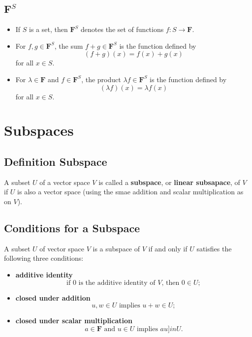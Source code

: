 \documentclass{article}
\begin{document}
	\subsection{$\mathbf{F}^S$}
	\begin{itemize}
		\item If $S$ is a set, then $\mathbf{F}^S$ denotes the set of functions $f:S\to\mathbf{F}$.
		\item For $f,g\in\mathbf{F}^S$, the sum $f + g\in\mathbf{F}^S$ is the function defined by
		\begin{equation*}
			(f + g)(x) = f(x) + g(x)
		\end{equation*}
		for all $x\in S$.
		\item For $\lambda\in\mathbf{F}$ and $f\in\mathbf{F}^S$, the product $\lambda f\in\mathbf{F}^S$ is the function defined by
		\begin{equation*}
			(\lambda f)(x) = \lambda f(x)
		\end{equation*}
		for all $x\in S$.
	\end{itemize}

	\section{Subspaces}
	\subsection{Definition Subspace}
	A subset $U$ of a vector space $V$ is called a \textbf{subspace}, or \textbf{linear subsapace}, of $V$ if $U$ is also a vector space (using the smae addition and scalar multiplication as on $V$).

	\subsection{Conditions for a Subspace}
	A subset $U$ of vector space $V$ is a subspace of $V$ if and only if $U$ satisfies the following three conditions:
	\begin{itemize}
		\item\textbf{additive identity}
		\begin{equation*}
			\text{if } 0 \text{ is the additive identity of } V \text{, then } 0\in U;
		\end{equation*}
		\item\textbf{closed under addition}
		\begin{equation*}
			u,w\in U \text{ implies } u+ w \in U;
		\end{equation*}
		\item\textbf{closed under scalar multiplication}
		\begin{equation*}
			a\in\mathbf{F} \text{ and } u \in U \text{ implies } au]in U.
		\end{equation*}
	\end{itemize}
\end{document}
